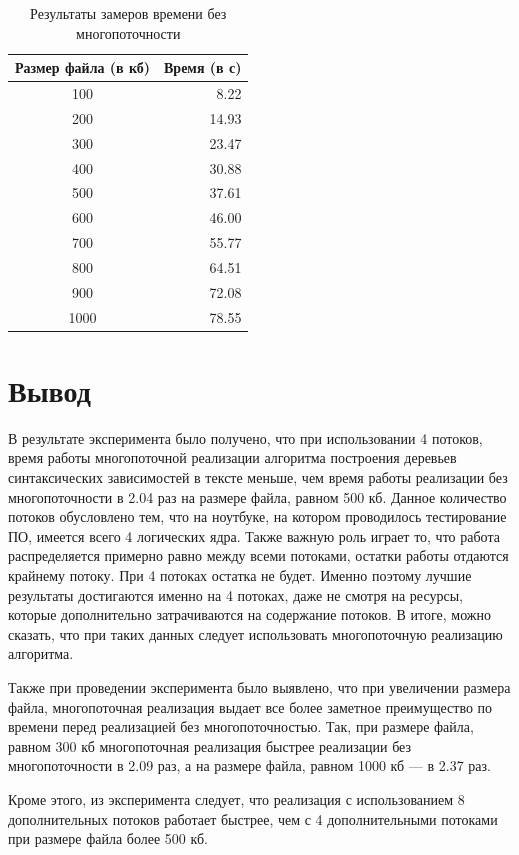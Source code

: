 \begin{table}[h]
	\begin{center}
		\begin{threeparttable}
			\captionsetup{justification=raggedright,singlelinecheck=off}
			\caption{Результаты замеров времени без многопоточности}
			\label{tbl:time_mes_difdiam}
			\begin{tabular}{|c|r|}
				\hline
				Размер файла (в кб) & Время (в с) \\
				\hline
				100 & 8.22 \\ 
				\hline
				200 & 14.93 \\ 
				\hline
				300 & 23.47 \\ 
				\hline
				400 & 30.88 \\ 
				\hline
				500 & 37.61 \\ 
				\hline
				600 & 46.00 \\ 
				\hline
				700 & 55.77 \\ 
				\hline
				800 & 64.51 \\ 
				\hline
				900 & 72.08 \\ 
				\hline
				1000 & 78.55 \\ 
				\hline
			\end{tabular}
		\end{threeparttable}
	\end{center}
\end{table}

\section*{Вывод}

В результате эксперимента было получено, что при использовании 4 потоков, время работы многопоточной реализации алгоритма построения деревьев синтаксических зависимостей в тексте меньше, чем время работы реализации без многопоточности в 2.04 раз на размере файла, равном 500 кб. Данное количество потоков обусловлено тем, что на ноутбуке, на котором проводилось тестирование ПО, имеется всего 4 логических ядра. Также важную роль играет то, что работа распределяется примерно равно между всеми потоками, остатки работы отдаются крайнему потоку. При 4 потоках остатка не будет. Именно поэтому лучшие результаты достигаются именно на 4 потоках, даже не смотря на ресурсы, которые дополнительно затрачиваются на содержание потоков. В итоге, можно сказать, что при таких данных следует использовать многопоточную реализацию алгоритма.

Также при проведении эксперимента было выявлено, что при увеличении размера файла, многопоточная реализация выдает все более заметное преимущество по времени перед реализацией без многопоточностью. Так, при размере файла, равном 300 кб многопоточная реализация быстрее реализации без многопоточности в 2.09 раз, а на размере файла, равном 1000 кб --- в 2.37 раз. 

Кроме этого, из эксперимента следует, что реализация с использованием 8 дополнительных потоков работает быстрее, чем с 4 дополнительными потоками при размере файла более 500 кб.